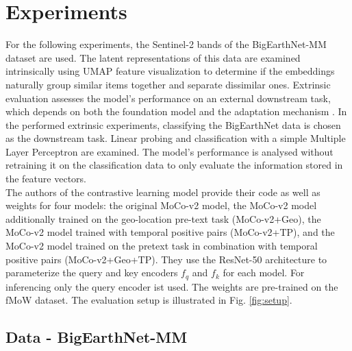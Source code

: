 \section{Experiments}

For the following experiments, the Sentinel-2 bands of the BigEarthNet-MM dataset \cite{bigEartNetMM} are used. The latent representations of this data are examined intrinsically using UMAP feature visualization to determine if the embeddings naturally group similar items together and separate dissimilar ones. Extrinsic evaluation assesses the model's performance on an external downstream task, which depends on both the foundation model and the adaptation mechanism \cite{foundationModels}. In the performed extrinsic experiments, classifying the BigEarthNet data is chosen as the downstream task. Linear probing and classification with a simple Multiple Layer Perceptron are examined. The model's performance is analysed without retraining it on the classification data to only evaluate the information stored in the feature vectors. \\
The authors of the contrastive learning model \cite{geoAwareSelfSuper} provide their code as well as weights for four models: the original MoCo-v2 model, the MoCo-v2 model additionally trained on the geo-location pre-text task (MoCo-v2+Geo), the MoCo-v2 model trained with temporal positive pairs (MoCo-v2+TP), and the MoCo-v2 model trained on the pretext task in combination with temporal positive pairs (MoCo-v2+Geo+TP). They use the ResNet-50 \cite{resnet} architecture to parameterize the query and key encoders $f_q$ and $f_k$ for each model. For inferencing only the query encoder ist used. The weights are pre-trained on the fMoW \cite{fmow} dataset. The evaluation setup is illustrated in Fig. \ref{fig:setup}.

\subsection{Data - BigEarthNet-MM}

